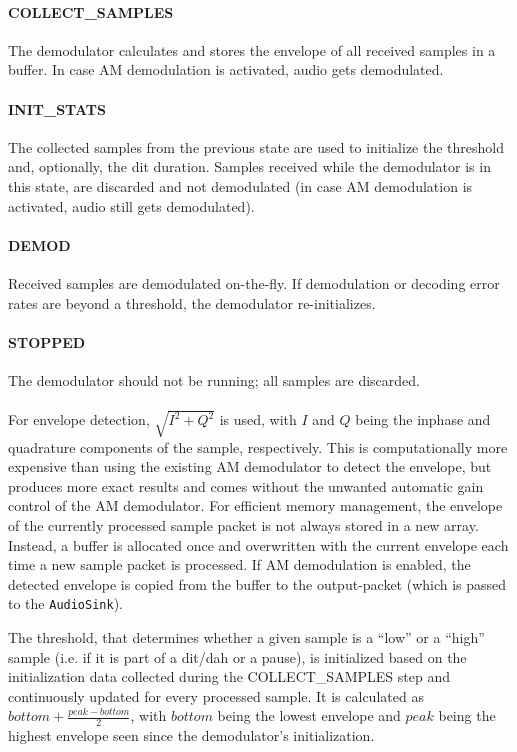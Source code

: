\paragraph{COLLECT\_{}SAMPLES} The demodulator calculates and stores the envelope of all received samples in a buffer. In case \ac{AM} demodulation is activated, audio gets demodulated.
\paragraph{INIT\_{}STATS} The collected samples from the previous state are used to initialize the threshold and, optionally, the dit duration. Samples received while the demodulator is in this state, are discarded and not demodulated (in case \ac{AM} demodulation is activated, audio still gets demodulated).
\paragraph{DEMOD} Received samples are demodulated on-the-fly. If demodulation or decoding error rates are beyond a threshold, the demodulator re-initializes.
\paragraph{STOPPED} The demodulator should not be running; all samples are discarded.
\paragraph{}

For envelope detection, $\sqrt{I^{2}+Q^{2}}$ is used, with $I$ and $Q$ being the inphase and quadrature components of the sample, respectively. This is computationally more expensive than using the existing \ac{AM} demodulator to detect the envelope, but produces more exact results and comes without the unwanted automatic gain control of the \ac{AM} demodulator. For efficient memory management, the envelope of the currently processed sample packet is not always stored in a new array. Instead, a buffer is allocated once and overwritten with the current envelope each time a new sample packet is processed. If \ac{AM} demodulation is enabled, the detected envelope is copied from the buffer to the output-packet (which is passed to the \texttt{AudioSink}).

The threshold, that determines whether a given sample is a ``low'' or a ``high'' sample (i.e. if it is part of a dit/dah or a pause), is initialized based on the initialization data collected during the COLLECT\_{}SAMPLES step and continuously updated for every processed sample. It is calculated as $bottom + \frac{peak - bottom}{2}$, with $bottom$ being the lowest envelope and $peak$ being the highest envelope seen since the demodulator's initialization.

